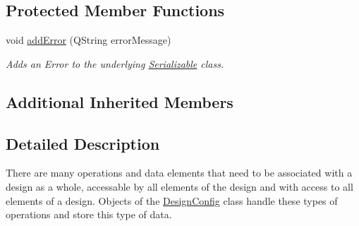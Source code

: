 \subsection*{Protected Member Functions}
\begin{DoxyCompactItemize}
\item 
void \hyperlink{class_picto_1_1_design_config_a19dcd01857819f4dfb4d739044670e2d}{add\-Error} (Q\-String error\-Message)
\begin{DoxyCompactList}\small\item\em Adds an Error to the underlying \hyperlink{class_picto_1_1_serializable}{Serializable} class. \end{DoxyCompactList}\end{DoxyCompactItemize}
\subsection*{Additional Inherited Members}


\subsection{Detailed Description}
There are many operations and data elements that need to be associated with a design as a whole, accessable by all elements of the design and with access to all elements of a design. Objects of the \hyperlink{class_picto_1_1_design_config}{Design\-Config} class handle these types of operations and store this type of data. 

